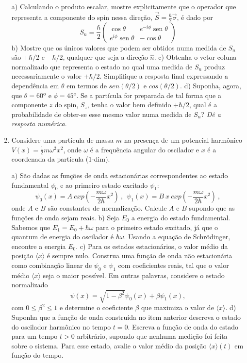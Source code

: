 \begin{enumerate}[start=1,label={\bfseries Q\arabic*.}]
a) Calculando o produto escalar, mostre explicitamente que o operador que representa a componente do spin nessa direção, $ \vec{S} = \frac{\hbar}{2} \vec{\sigma} $, é dado por
$$
S_{n}=\frac{\hbar}{2}\left(\begin{array}{cc}
\cos \theta & e^{-i \phi} \operatorname{sen} \theta \\
e^{i \phi} \operatorname{sen} \theta & -\cos \theta
\end{array}\right)
$$
b) Mostre que os únicos valores que podem ser obtidos numa medida de $S_{n}$ são $+\hbar / 2$ e $- \hbar/2$, qualquer que seja a direção $\hat{n}$.
c) Obtenha o vetor coluna normalizado que representa o estado no qual uma medida de $S_{n}$ produz necessariamente o valor $+\hbar/2$. Simplifique a resposta final expressando a dependência em $\theta$ em termos de $sen(\theta/2)$ e $cos(\theta/2)$.
d) Suponha, agora, que $\theta = 60º$ e $\phi = 45º$. Se a partícula for preparada de tal forma que a componente $z$ do spin, $S_{z}$, tenha o valor bem definido $+\hbar/2$, qual é a probabilidade de obter-se esse mesmo valor numa medida de $S_{n}$? \textit{Dê a resposta numérica}.






\item Considere uma partícula de massa $m$ na presença de um potencial harmônico $V(x) = \frac{1}{2} m \omega^{2}x^{2}$, onde $\omega$ é a frequência angular do oscilador e $x$ é a coordenada da partícula (1-dim).

a) São dadas as funções de onda estacionárias correspondentes ao estado fundamental $\psi_{0}$ e ao primeiro estado excitado $\psi_{1}$:
$$
\psi_{0}(x) = A \ exp \left(- \frac{m \omega}{2 \hbar} x^{2}  \right) \ , \  \  \psi_{1}(x) = B \ x \ exp \left(- \frac{m \omega}{2 \hbar} x^{2}  \right) \ ,
$$
onde $A$ e $B$ são constantes de normalização. Calcule $A$ e $B$ supondo que as funções de onda sejam reais.
b) Seja $E_{0}$ a energia do estado fundamental. Sabemos que $E_{1} = E_{0} + \hbar \omega$ para o primeiro estado excitado, já que o quantum de energia do oscilador é $\hbar \omega$. Usando a equação de Schrödinger, encontre a energia $E_{0}$.
c) Para os estados estacionários, o valor médio da posição $\langle x \rangle$ é sempre nulo. Construa uma função de onda não estacionária como combinação linear de $\psi_{0}$ e $\psi_{1}$ com coeficientes reais, tal que o valor médio $\langle x \rangle$ seja o maior possível. Em outras palavras, considere o estado normalizado
$$
\psi(x) = \sqrt{1 - \beta^{2}} \psi_{0} (x) + \beta \psi_{1} (x),
$$
com $0 \leq \beta^{2} \leq 1$ e determine o coeficiente $\beta$ que maximiza o valor de $\langle x \rangle$.
d) Suponha que a função de onda construída no item anterior descreva o estado do oscilador harmônico no tempo $t = 0$. Escreva a função de onda do estado para um tempo $t > 0$ arbitrário, supondo que nenhuma medição foi feita sobre o sistema. Para esse estado, avalie o valor médio da posição $\langle x \rangle (t)$ em função do tempo.





\end{enumerate}
